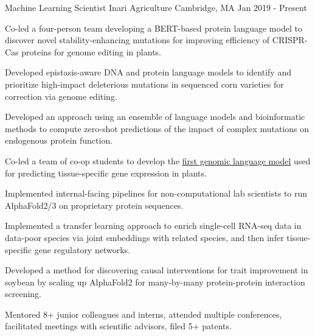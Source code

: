 

\begin{cventries}

  \cventry
    {Machine Learning Scientist} %
    {Inari Agriculture} %
    {Cambridge, MA} %
    {Jan 2019 - Present} %
    {
      \begin{cvitems} %
        \item {Co-led a four-person team developing a BERT-based protein language model to discover novel stability-enhancing mutations for improving efficiency of CRISPR-Cas proteins for genome editing in plants.}
        \item {Developed epistasis-aware DNA and protein language models to identify and prioritize high-impact deleterious mutations in sequenced corn varieties for correction via genome editing.}
        \item {Developed an approach using an ensemble of language models and bioinformatic methods to compute zero-shot predictions of the impact of complex mutations on endogenous protein function.}
        \item {Co-led a team of co-op students to develop the \href{https://assets-eu.researchsquare.com/files/rs-1927200/v1_covered.pdf}{first genomic language model} used for predicting tissue-specific gene expression in plants.}
        \item {Implemented internal-facing pipelines for non-computational lab scientists to run AlphaFold2/3 on proprietary protein sequences.}
        \item {Implemented a transfer learning approach to enrich single-cell RNA-seq data in data-poor species via joint embeddings with related species, and then infer tissue-specific gene regulatory networks.}
        \item {Developed a method for discovering causal interventions for trait improvement in soybean by scaling up AlphaFold2 for many-by-many protein-protein interaction screening.}
        \item {Mentored 8+ junior colleagues and interns, attended multiple conferences, facilitated meetings with scientific advisors, filed 5+ patents.}
      \end{cvitems}
    }


\end{cventries}
